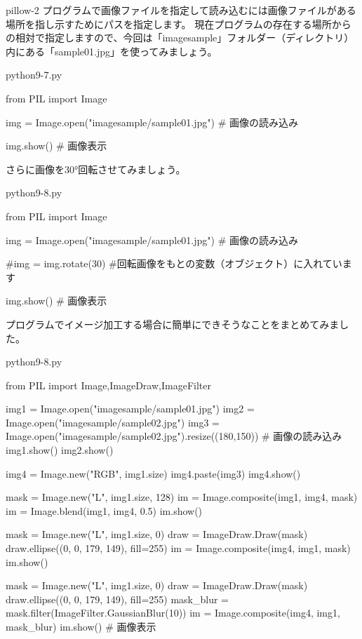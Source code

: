 \documentclass[11pt,a4paper,dvipdfmx,titlepage]{jsreport}
\begin{document}
\begin{pabox}{pillow-2}
プログラムで画像ファイルを指定して読み込むには画像ファイルがある場所を指し示すためにパスを指定します。
現在プログラムの存在する場所からの相対で指定しますので、今回は「imagesample」フォルダー（ディレクトリ）内にある「sample01.jpg」を使ってみましょう。


\begin{codebox}{python9-7.py}
\begin{listing}{1}
from PIL import Image

img = Image.open("imagesample/sample01.jpg")  
# 画像の読み込み

img.show()  # 画像表示

\end{listing}
\end{codebox}

さらに画像を30°回転させてみましょう。


\begin{codebox}{python9-8.py}
\begin{listing}{1}
from PIL import Image

img = Image.open("imagesample/sample01.jpg")  
# 画像の読み込み

#img = img.rotate(30)
#回転画像をもとの変数（オブジェクト）に入れています

img.show()  # 画像表示

\end{listing}
\end{codebox}


プログラムでイメージ加工する場合に簡単にできそうなことをまとめてみました。

\begin{codebox}{python9-8.py}
\begin{listing}{1}
from PIL import Image,ImageDraw,ImageFilter

img1 = Image.open("imagesample/sample01.jpg") 
img2 = Image.open("imagesample/sample02.jpg") 
img3 = Image.open("imagesample/sample02.jpg").resize((180,150))
# 画像の読み込み
img1.show()  
img2.show()

img4 = Image.new("RGB", img1.size)
img4.paste(img3)
img4.show()

mask = Image.new("L", img1.size, 128)
im = Image.composite(img1, img4, mask)
im = Image.blend(img1, img4, 0.5)
im.show()

mask = Image.new("L", img1.size, 0)
draw = ImageDraw.Draw(mask)
draw.ellipse((0, 0, 179, 149), fill=255)
im = Image.composite(img4, img1, mask)
im.show()

mask = Image.new("L", img1.size, 0)
draw = ImageDraw.Draw(mask)
draw.ellipse((0, 0, 179, 149), fill=255)
mask_blur = mask.filter(ImageFilter.GaussianBlur(10))
im = Image.composite(img4, img1, mask_blur)
im.show()
# 画像表示
\end{listing}
\end{codebox}
\end{pabox}
\end{document}
